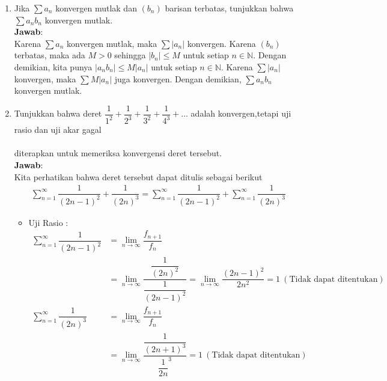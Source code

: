 \documentclass[a4paper, 12pt]{article}
\newcommand{\ans}{\textbf{Jawab}:}
\newcommand{\N}{\mathbb{N}}
\begin{document}
\begin{enumerate}
\begin{enumerate}
            \item Apakah $(f_n)$ konvergen seragam pada $A$? Jelaskan!\\
            \ans\\
            Tidak konvergen seragam, karena $f$ tidak kontinu pada $A$, padahal $(f_n)$ kontinu untuk setiap $n\in\N$.
        \end{enumerate}

        \item Jika $\sum a_n$ konvergen mutlak dan $(b_n)$ barisan terbatas, tunjukkan bahwa $\sum a_nb_n$ konvergen mutlak.\\
        \ans\\
        Karena $\sum a_n$ konvergen mutlak, maka $\sum |a_n|$ konvergen. Karena $(b_n)$ terbatas,
        maka ada $M>0$ sehingga $|b_n|\leq M$ untuk setiap $n\in\N$. Dengan demikian, kita punya 
        $|a_nb_n|\leq M|a_n|$ untuk setiap $n\in\N$. Karena $\sum |a_n|$ konvergen, maka $\sum M|a_n|$
        juga konvergen. Dengan demikian, $\sum a_nb_n$ konvergen mutlak.

        \item Tunjukkan bahwa deret $\dfrac{1}{1^2}+\dfrac{1}{2^3}+\dfrac{1}{3^2}+\dfrac{1}{4^3}+\dots$ adalah konvergen,tetapi uji rasio dan uji akar gagal \\~\\
        diterapkan untuk memeriksa konvergensi deret tersebut.\\

        \ans\\
        Kita perhatikan bahwa deret tersebut dapat ditulis sebagai berikut
        \begin{align*}
            \sum_{n=1}^{\infty}\dfrac{1}{(2n-1)^2}+\dfrac{1}{(2n)^3}=\sum_{n=1}^{\infty}\dfrac{1}{(2n-1)^2}+\sum_{n=1}^{\infty}\dfrac{1}{(2n)^3}
        \end{align*}

        \begin{itemize}
            \item Uji Rasio : 
            \begin{align*}
                 \sum_{n=1}^{\infty}\dfrac{1}{(2n-1)^2} &= \lim_{n \to \infty} \dfrac{f_{n+1}}{f_n} \\
                 &= \lim_{n \to \infty} \dfrac{\dfrac{1}{(2n)^2}}{\dfrac{1}{(2n-1)^2}} = \lim_{n \to \infty} \dfrac{(2n-1)^2}{2n^2} = 1 \ (\text{Tidak dapat ditentukan}) \\
                 \sum_{n=1}^{\infty}\dfrac{1}{(2n)^3} &= \lim_{n \to \infty} \dfrac{f_{n+1}}{f_n} \\
                 &= \lim_{n \to \infty} \dfrac{\dfrac{1}{(2n+1)^3}}{\dfrac{1}{2n}^3} = 1 \ (\text{Tidak dapat ditentukan})
            \end{align*}


\end{itemize}
\end{enumerate}
\end{document}
